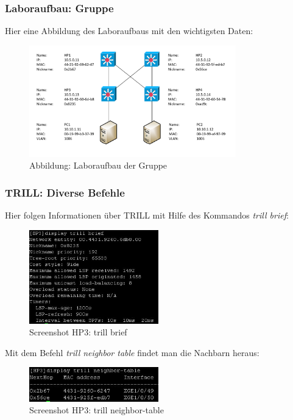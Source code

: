 \documentclass[a4,12pt]{scrartcl}
\begin{document}
\subsubsection{Laboraufbau: Gruppe}
Hier eine Abbildung des Laboraufbaus mit den wichtigsten Daten: 
\begin{figure} [H]
	\begin{center}
	\includegraphics[width=0.80\textwidth]{./draws/trill_ex2_laboraufbau.pdf}
	\caption{Abbildung: Laboraufbau der Gruppe}
	\label{x}
	\end{center}
\end{figure}


\subsubsection{TRILL: Diverse Befehle}
Hier folgen Informationen über TRILL mit Hilfe des Kommandos \textit{trill brief}:
\begin{figure} [H]
	\begin{center}
	\includegraphics[width=0.50\textwidth]{./pictures/brief.jpg}
	\caption{Screenshot HP3: trill brief}
	\label{x}
	\end{center}
\end{figure}

Mit dem Befehl \textit{trill neighbor table} findet man die Nachbarn heraus: 
\begin{figure} [H]
	\begin{center}
	\includegraphics[width=0.50\textwidth]{./pictures/neighbor-table.jpg}
	\caption{Screenshot HP3: trill neighbor-table}
	\label{x}
	\end{center}
\end{figure}
\end{document}
